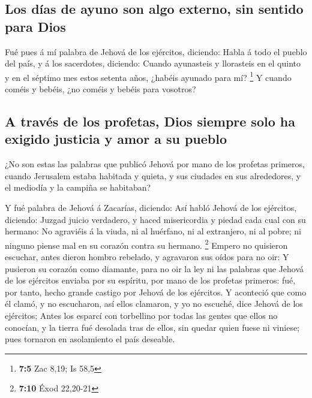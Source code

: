 \hypertarget{los-duxedas-de-ayuno-son-algo-externo-sin-sentido-para-dios}{%
\subsection{Los días de ayuno son algo externo, sin sentido para
Dios}\label{los-duxedas-de-ayuno-son-algo-externo-sin-sentido-para-dios}}

 Fué pues á mí palabra de Jehová de los ejércitos,
diciendo:  Habla á todo el pueblo del país, y á los
sacerdotes, diciendo: Cuando ayunasteis y llorasteis en el quinto y en
el séptimo mes estos setenta años, ¿habéis ayunado para mí? \footnote{\textbf{7:5}
  Zac 8,19; Is 58,5}  Y cuando coméis y bebéis, ¿no coméis
y bebéis para vosotros?

\hypertarget{a-travuxe9s-de-los-profetas-dios-siempre-solo-ha-exigido-justicia-y-amor-a-su-pueblo}{%
\subsection{A través de los profetas, Dios siempre solo ha exigido
justicia y amor a su
pueblo}\label{a-travuxe9s-de-los-profetas-dios-siempre-solo-ha-exigido-justicia-y-amor-a-su-pueblo}}

 ¿No son estas las palabras que publicó Jehová por mano de
los profetas primeros, cuando Jerusalem estaba habitada y quieta, y sus
ciudades en sus alrededores, y el mediodía y la campiña se habitaban?

 Y fué palabra de Jehová á Zacarías, diciendo:
 Así habló Jehová de los ejércitos, diciendo: Juzgad
juicio verdadero, y haced misericordia y piedad cada cual con su
hermano:  No agraviéis á la viuda, ni al huérfano, ni al
extranjero, ni al pobre; ni ninguno piense mal en su corazón contra su
hermano. \footnote{\textbf{7:10} Éxod 22,20-21}  Empero
no quisieron escuchar, antes dieron hombro rebelado, y agravaron sus
oídos para no oir:  Y pusieron su corazón como diamante,
para no oir la ley ni las palabras que Jehová de los ejércitos enviaba
por su espíritu, por mano de los profetas primeros: fué, por tanto,
hecho grande castigo por Jehová de los ejércitos.  Y
aconteció que como él clamó, y no escucharon, así ellos clamaron, y yo
no escuché, dice Jehová de los ejércitos;  Antes los
esparcí con torbellino por todas las gentes que ellos no conocían, y la
tierra fué desolada tras de ellos, sin quedar quien fuese ni viniese;
pues tornaron en asolamiento el país deseable.

